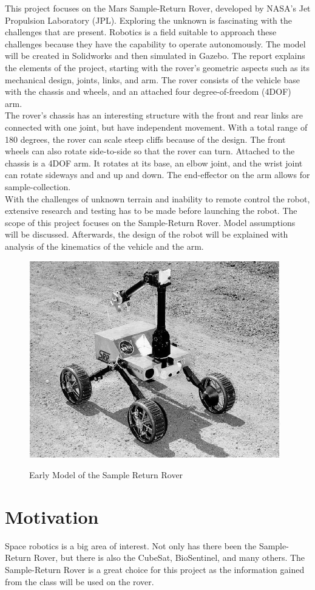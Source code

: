 \noindent
This project focuses on the Mars Sample-Return Rover, developed by NASA's Jet Propulsion Laboratory (JPL). Exploring the unknown is fascinating with the challenges that are present. Robotics is a field suitable to approach these challenges because they have the capability to operate autonomously. The model will be created in Solidworks and then simulated in Gazebo. The report explains the elements of the project, starting with the rover's geometric aspects such as its mechanical design, joints, links, and arm. The rover consists of the vehicle base with the chassis and wheels, and an attached four degree-of-freedom (4DOF) arm.\\

The rover's chassis has an interesting structure with the front and rear links are connected with one joint, but have independent movement. With a total range of 180 degrees, the rover can scale steep cliffs because of the design. The front wheels can also rotate side-to-side so that the rover can turn. Attached to the chassis is a 4DOF arm. It rotates at its base, an elbow joint, and the wrist joint can rotate sideways and and up and down. The end-effector on the arm allows for sample-collection. \\

With the challenges of unknown terrain and inability to remote control the robot, extensive research and testing has to be made before launching the robot. The scope of this project focuses on the Sample-Return Rover. Model assumptions will be discussed. Afterwards, the design of the robot will be explained with analysis of the kinematics of the vehicle and the arm.

\begin{figure}[htb]
	\centering
	\includegraphics[scale=0.70]{sections/introduction/images/srr.png}
	\label{sample_return_rover:introduction:sample_return_rover}
	\caption{Early Model of the Sample Return Rover}
\end{figure}


\section{Motivation}
Space robotics is a big area of interest. Not only has there been the Sample-Return Rover, but there is also the CubeSat, BioSentinel, and many others. The Sample-Return Rover is a great choice for this project as the information gained from the class will be used on the rover.